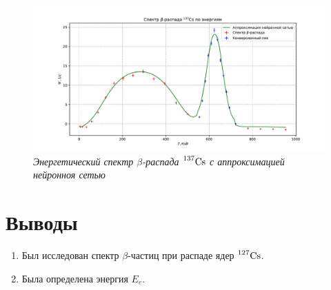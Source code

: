 \documentclass[a4paper,12pt]{article}
\begin{document}
\FloatBarrier
\begin{figure}[!ht]
	\includegraphics[width=1.1\textwidth]{plots/T_N_nn.pdf}
	\caption{\textit{Энергетический спектр $\beta$-распада $\prescript{137}{}{\text{Cs}}$ с аппроксимацией нейронноя сетью}}
	\label{plot:T_N_nn}
\end{figure}
\FloatBarrier


\section{Выводы}

\begin{enumerate}
    \item Был исследован спектр $\beta$-частиц при распаде ядер $\prescript{127}{}{\text{Cs}}$.
    \item Была определена энергия $E_e$.
\end{enumerate}
\end{document}
